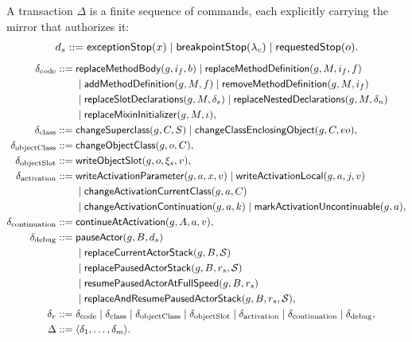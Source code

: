 A transaction $\Delta$ is a finite sequence of commands, each explicitly
carrying the mirror that authorizes it:
\begin{equation}\label{eq:debug-stop-reasons}
 d_s::=\mathsf{exceptionStop}(x)\mid\mathsf{breakpointStop}(\lambda_c)
       \mid\mathsf{requestedStop}(o).
\end{equation}
\begin{equation}\label{eq:reflection-command-grammar}
\begin{split}
 \delta_{\mathrm{code}}::={}&
 \mathsf{replaceMethodBody}(g,i_f,b)
 \mid\mathsf{replaceMethodDefinition}(g,M,i_f,f)\\
 &\mid\mathsf{addMethodDefinition}(g,M,f)
 \mid\mathsf{removeMethodDefinition}(g,M,i_f)\\
 &\mid\mathsf{replaceSlotDeclarations}(g,M,\delta_s)
 \mid\mathsf{replaceNestedDeclarations}(g,M,\delta_n)\\
 &\mid\mathsf{replaceMixinInitializer}(g,M,\iota),\\
 \delta_{\mathrm{class}}::={}&
 \mathsf{changeSuperclass}(g,C,S)
 \mid\mathsf{changeClassEnclosingObject}(g,C,eo),\\
 \delta_{\mathrm{objectClass}}::={}&
 \mathsf{changeObjectClass}(g,o,C),\\
 \delta_{\mathrm{objectSlot}}::={}&
 \mathsf{writeObjectSlot}(g,o,\xi_s,v),\\
 \delta_{\mathrm{activation}}::={}&
 \mathsf{writeActivationParameter}(g,a,x,v)
 \mid\mathsf{writeActivationLocal}(g,a,j,v)\\
 &\mid\mathsf{changeActivationCurrentClass}(g,a,C)\\
 &\mid\mathsf{changeActivationContinuation}(g,a,k)
 \mid\mathsf{markActivationUncontinuable}(g,a),\\
 \delta_{\mathrm{continuation}}::={}&
 \mathsf{continueAtActivation}(g,A,a,v),\\
 \delta_{\mathrm{debug}}::={}&
 \mathsf{pauseActor}(g,B,d_s)\\
 &\mid\mathsf{replaceCurrentActorStack}(g,B,\mathcal S)\\
 &\mid\mathsf{replacePausedActorStack}(g,B,r_s,\mathcal S)\\
 &\mid\mathsf{resumePausedActorAtFullSpeed}(g,B,r_s)\\
 &\mid\mathsf{replaceAndResumePausedActorStack}(g,B,r_s,\mathcal S),\\
 \delta_r::={}&\delta_{\mathrm{code}}
 \mid\delta_{\mathrm{class}}
 \mid\delta_{\mathrm{objectClass}}
 \mid\delta_{\mathrm{objectSlot}}
 \mid\delta_{\mathrm{activation}}
 \mid\delta_{\mathrm{continuation}}
 \mid\delta_{\mathrm{debug}},\\
 \Delta::={}&\langle\delta_1,\ldots,\delta_m\rangle.
\end{split}
\end{equation}
